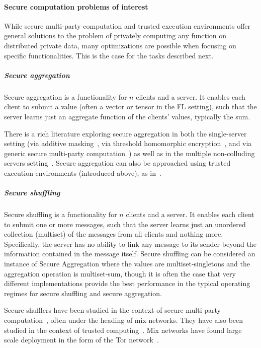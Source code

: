 \paragraph{Secure computation problems of interest}

While secure multi-party computation and trusted execution environments offer general solutions to the problem of privately computing any function on distributed private data, many optimizations are possible when focusing on specific functionalities. This is the case for the tasks described next.

\subparagraph{Secure aggregation}
Secure aggregation is a functionality for $n$ clients and a server.  It enables each client to submit a value (often a vector or tensor in the FL setting), such that the server learns just an aggregate function of the clients' values, typically the sum.  

There is a rich literature exploring secure aggregation in both the single-server setting (via additive masking~\cite{Acs:2011:IDD:2042445.2042457, DBLP:journals/tdsc/GoryczkaX17, bonawitz17secagg, bell20secagg,so2020turbo}, via threshold homomorphic encryption~\cite{shi2011privacy, halevi2011secure, chan2012privacy}, and via generic secure multi-party computation~\cite{burkhart2010sepia}) as well as in the multiple non-colluding servers setting~\cite{DBLP:conf/fc/BogetoftCDGJKNNNPST09, araki2016high, corrigan2017prio}.
Secure aggregation can also be approached using trusted execution environments (introduced above), as in~\cite{lie2017glimmers}.

\subparagraph{Secure shuffling}
Secure shuffling is a functionality for $n$ clients and a server.   It enables each client to submit one or more messages, such that the server learns just an unordered collection (multiset) of the messages from all clients and nothing more.  Specifically, the server has no ability to link any message to its sender beyond the information contained in the message itself.  
Secure shuffling can be considered an instance of Secure Aggregation where the values are multiset-singletons and the aggregation operation is multiset-sum, though it is often the case that very different implementations provide the best performance in the typical operating regimes for secure shuffling and secure aggregation.

Secure shufflers have been studied in the context of secure multi-party computation~\cite{chaum1981untraceable, kwon2016riffle}, often under the heading of mix networks.   They have also been studied in the context of trusted computing~\cite{prochlo}.  Mix networks have found large scale deployment in the form of the Tor network~\cite{dingledine2004tor}.  


